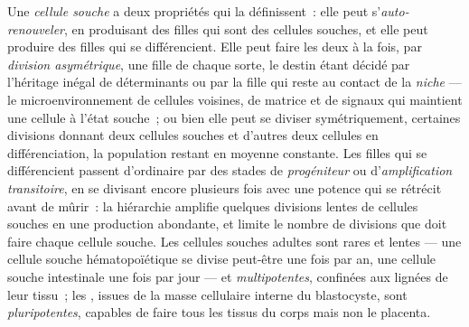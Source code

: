 \begin{definition}\label{def:b3:stem-cells:stem}
Une \emph{cellule souche} a deux propriétés qui la définissent~: elle
peut s'\emph{auto-renouveler}, en produisant des filles qui sont des
cellules souches, et elle peut produire des filles qui se différencient.
Elle peut faire les deux à la fois, par \emph{division asymétrique}, une
fille de chaque sorte, le destin étant décidé par l'héritage inégal de
déterminants ou par la fille qui reste au contact de la \emph{niche} ---
le microenvironnement de cellules voisines, de matrice et de signaux qui
maintient une cellule à l'état souche~; ou bien elle peut se diviser
symétriquement, certaines divisions donnant deux cellules souches et
d'autres deux cellules en différenciation, la population restant en
moyenne constante. Les filles qui se différencient passent d'ordinaire
par des stades de \emph{progéniteur} ou d'\emph{amplification
transitoire}, en se divisant encore plusieurs fois avec une potence qui
se rétrécit avant de mûrir~: la hiérarchie amplifie quelques divisions
lentes de cellules souches en une production abondante, et limite le
nombre de divisions que doit faire chaque cellule souche. Les cellules
souches adultes sont rares et lentes --- une cellule souche
hématopoïétique se divise peut-être une fois par an, une cellule souche
intestinale une fois par jour --- et \emph{multipotentes}, confinées aux
lignées de leur tissu~; les , issues de la
masse cellulaire interne du blastocyste, sont \emph{pluripotentes},
capables de faire tous les tissus du corps mais non le placenta.
\end{definition}

